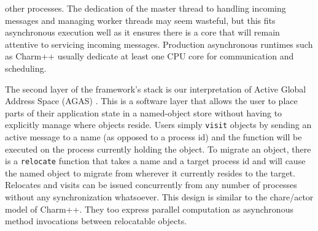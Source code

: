 other processes.
The dedication of the master thread to handling
incoming messages and managing worker threads may seem wasteful,
but this fits asynchronous 
execution well as it ensures there is a core that will remain 
attentive to servicing incoming messages.
Production asynchronous runtimes such as Charm++
usually dedicate at least one CPU core for communication and scheduling.

The second layer of the framework's stack is our interpretation of 
Active Global Address Space (AGAS) \cite{hpx}. This is a software layer
that allows the user to place parts of their application state in a 
named-object store without having to explicitly manage where
objects reside. Users simply {\tt visit} objects by sending an active 
message to a name (as opposed to a process id) and the function will be 
executed on the process currently holding the object.
To migrate an object, there is a {\tt relocate} function that takes a 
name and a target process id and will cause the named object to 
migrate from wherever it currently resides to the target.
Relocates and visits can be issued concurrently from any 
number of processes without any synchronization whatsoever.
This design is similar to the chare/actor model of Charm++.
They too express parallel computation as asynchronous method invocations
between relocatable objects.

